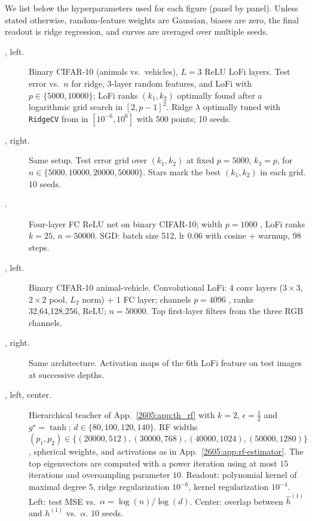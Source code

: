 We list below the hyperparameters used for each figure (panel by panel).
Unless stated otherwise, random-feature weights are Gaussian, biases are zero,
the final readout is ridge regression, and curves are averaged over multiple
seeds.

\begin{description}

  \item[, left.]
    Binary CIFAR-10 (animals vs.\ vehicles), $L=3$ ReLU LoFi layers.
    Test error vs.\ $n$ for ridge, 3-layer random features, and LoFi with
    $p\in\{5000, 10000\}$; LoFi ranks $(k_1,k_2)$ optimally found after a logarithmic grid search in $[2, p-1]^2$. Ridge $\lambda$ optimally tuned with \texttt{RidgeCV} from \cite{pedregosa2011scikit} in $[10^{-6}, 10^{6}]$ with $500$ points; 10 seeds.

  \item[, right.]
    Same setup. Test error grid over $(k_1,k_2)$ at fixed $p=5000$, $k_3=p$, for $n\in\{5000,10000,20000,50000\}$. Stars mark the best $(k_1,k_2)$ in each grid. 10 seeds.

  \item[.]
    Four-layer FC ReLU net on binary CIFAR-10; width $p=1000$ , LoFi ranks
    $k=25$, $n=50000$. SGD: batch size 512, lr 0.06 with cosine + warmup,
    98 steps.

  \item[, left.]
    Binary CIFAR-10 animal-vehicle. Convolutional LoFi: 4 conv layers ($3{\times}3$,
    $2{\times}2$ pool, $L_2$ norm) + 1 FC layer; channels $p=4096$ , ranks
    32,64,128,256, ReLU; $n=50000$. Top first-layer filters from the three RGB
    channels.

  \item[, right.]
    Same architecture. Activation maps of the 6th LoFi feature on test images
    at successive depths.

\item[, left, center.]
    Hierarchical teacher of App.~\ref{2605:app:th_rf} with $k=2$, $\epsilon=\tfrac12$ and $g^\star=\tanh$; $d\in\{80,100,120,140\}$. RF widths $(p_1,p_2)\in\{(20000,512),(30000,768),(40000,1024),(50000,1280)\}$, spherical weights, and activations as in App.~\ref{2605:app:rf-estimator}. The top eigenvectors are computed with a power iteration using at most $15$ iterations and oversampling parameter $10$. Readout: polynomial kernel of maximal degree $5$, ridge regularization $10^{-6}$, kernel regularization $10^{-4}$. Left: test MSE vs.\ $\alpha=\log(n)/\log(d)$. Center: overlap between $\widehat h^{(1)}$ and $h^{(1)}$ vs.\ $\alpha$. $10$ seeds.


\end{description}
